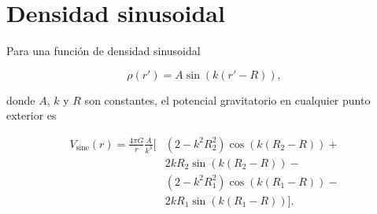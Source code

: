 \section{Densidad sinusoidal}

Para una función de densidad sinusoidal

\begin{equation}
    \rho(r') = A \sin ( k (r' - R)),
\end{equation}

\noindent donde $A$, $k$ y $R$ son constantes, el potencial gravitatorio en
cualquier punto exterior es

\begin{equation}
    \begin{split}
        V_\text{sine}(r) = \frac{4\pi G}{r} \frac{A}{k^3} \Big[
    & (2 - k^2 R_2^2) \cos(k(R_2 - R)) + \\
    & 2 k R_2 \sin(k(R_2 - R)) - \\
    & (2 - k^2 R_1^2) \cos(k(R_1 - R)) - \\
    & 2 k R_1 \sin(k(R_1 - R))
    \Big].
    \end{split}
\end{equation}
